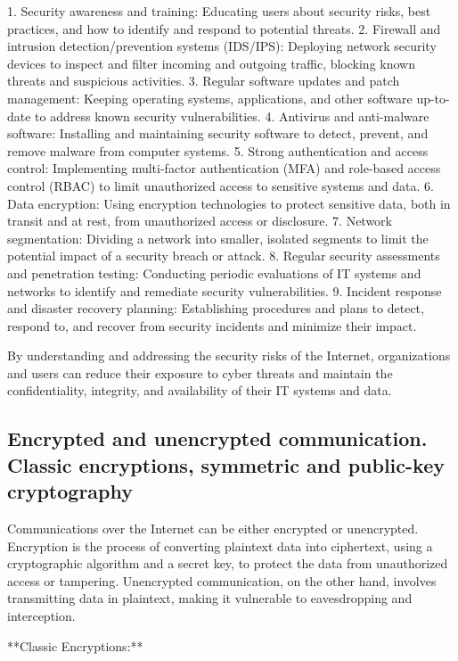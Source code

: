 \documentclass{article}
\begin{document}
1. Security awareness and training: Educating users about security risks, best practices, and how to identify and respond to potential threats.
2. Firewall and intrusion detection/prevention systems (IDS/IPS): Deploying network security devices to inspect and filter incoming and outgoing traffic, blocking known threats and suspicious activities.
3. Regular software updates and patch management: Keeping operating systems, applications, and other software up-to-date to address known security vulnerabilities.
4. Antivirus and anti-malware software: Installing and maintaining security software to detect, prevent, and remove malware from computer systems.
5. Strong authentication and access control: Implementing multi-factor authentication (MFA) and role-based access control (RBAC) to limit unauthorized access to sensitive systems and data.
6. Data encryption: Using encryption technologies to protect sensitive data, both in transit and at rest, from unauthorized access or disclosure.
7. Network segmentation: Dividing a network into smaller, isolated segments to limit the potential impact of a security breach or attack.
8. Regular security assessments and penetration testing: Conducting periodic evaluations of IT systems and networks to identify and remediate security vulnerabilities.
9. Incident response and disaster recovery planning: Establishing procedures and plans to detect, respond to, and recover from security incidents and minimize their impact.

By understanding and addressing the security risks of the Internet, organizations and users can reduce their exposure to cyber threats and maintain the confidentiality, integrity, and availability of their IT systems and data.


\subsection{Encrypted and unencrypted communication. Classic encryptions, symmetric and public-key cryptography}

Communications over the Internet can be either encrypted or unencrypted. Encryption is the process of converting plaintext data into ciphertext, using a cryptographic algorithm and a secret key, to protect the data from unauthorized access or tampering. Unencrypted communication, on the other hand, involves transmitting data in plaintext, making it vulnerable to eavesdropping and interception.

**Classic Encryptions:**
\end{document}
